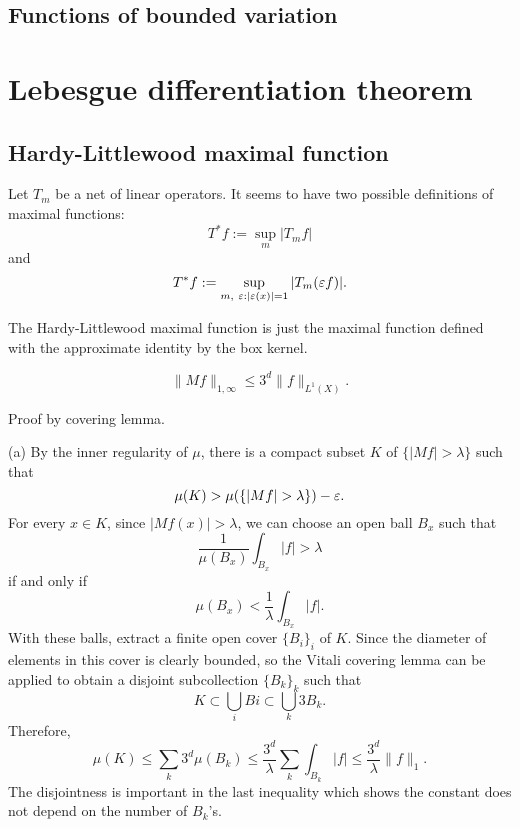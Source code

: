\documentclass{../../large}
\begin{document}
\begin{prb}
\end{prb}

\begin{prb}
\end{prb}



\section{Functions of bounded variation}




\chapter{Lebesgue differentiation theorem}

\section{Hardy-Littlewood maximal function}

Let $T_m$ be a net of linear operators.
It seems to have two possible definitions of maximal functions:
\[T^*f:=\sup_m|T_mf|\]
and
\[T^*f:=\sup_{m,\ \varepsilon:|\varepsilon(x)|=1}|T_m(\varepsilon f)|.\]

\begin{prb}
The Hardy-Littlewood maximal function is just the maximal function defined with the approximate identity by the box kernel.
\end{prb}

\begin{prb}
\[\|Mf\|_{1,\infty}\le 3^d\|f\|_{L^1(X)}.\]
\begin{parts}
\item Proof by covering lemma.
\end{parts}
\end{prb}
\begin{pf}
(a)
By the inner regularity of $\mu$, there is a compact subset $K$ of $\{|Mf|>\lambda\}$ such that
\[\mu(K)>\mu(\{|Mf|>\lambda\})-\e.\]
For every $x\in K$, since $|Mf(x)|>\lambda$, we can choose an open ball $B_x$ such that
\[\frac1{\mu(B_x)}\int_{B_x}|f|>\lambda\]
if and only if
\[\mu(B_x)<\frac1\lambda\int_{B_x}|f|.\]
With these balls, extract a finite open cover $\{B_i\}_i$ of $K$.
Since the diameter of elements in this cover is clearly bounded, so the Vitali covering lemma can be applied to obtain a disjoint subcollection $\{B_k\}_k$ such that
\[K\subset\bigcup_iBi\subset\bigcup_k3B_k.\]
Therefore,
\[\mu(K)
\le\sum_k3^d\mu(B_k)
\le\frac{3^d}\lambda\sum_k\int_{B_k}|f|
\le\frac{3^d}\lambda\|f\|_1.\]
The disjointness is important in the last inequality which shows the constant does not depend on the number of $B_k$'s.
\end{pf}
\end{document}
